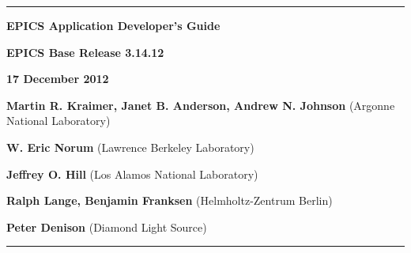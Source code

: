 \hrule

\vspace{1in}

\noindent \Huge \textbf{EPICS Application Developer's Guide}

\vspace{0.5in}

\noindent \Large \textbf{EPICS Base Release 3.14.12}

\noindent \textbf{17 December 2012}

\vspace{0.5in}

\normalsize
\noindent \textbf{Martin R. Kraimer, Janet B. Anderson, Andrew N. Johnson} (Argonne National Laboratory)

\noindent \textbf{W. Eric Norum} (Lawrence Berkeley Laboratory)

\noindent \textbf{Jeffrey O. Hill} (Los Alamos National Laboratory)

\noindent \textbf{Ralph Lange, Benjamin Franksen} (Helmholtz-Zentrum Berlin)

\noindent \textbf{Peter Denison} (Diamond Light Source)

\vspace{1in}
\hrule
